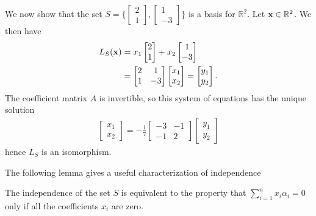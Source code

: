 \documentclass[12pt,letterpaper,reqno]{article}
\numberwithin{equation}{section}
\begin{document}
\begin{example}
We now show that the set $S=\{\begin{bmatrix}
	2 \\ 1
\end{bmatrix}, \begin{bmatrix}
	1 \\ -3
\end{bmatrix} \}$ is a basis for $\mathbb{R}^2$. Let ${\bf x} \in \mathbb{R}^2$. We then have 
\begin{align*}
	L_S({\bf x})&=x_1\begin{bmatrix}
	2 \\ 1
\end{bmatrix}+x_2\begin{bmatrix}
	1 \\ -3
\end{bmatrix} \\
&=\begin{bmatrix}
	2 & 1 \\ 1 & -3
\end{bmatrix}\begin{bmatrix}
	x_1 \\ x_2
\end{bmatrix} =\begin{bmatrix}
	y_1 \\ y_2
\end{bmatrix}.
\end{align*} The coefficient matrix $A$ is invertible, so this system of equations has the unique solution
\begin{align*}
	\begin{bmatrix}
	x_1 \\ x_2
\end{bmatrix}=-\frac{1}{7}\begin{bmatrix}
	-3 & -1 \\ -1 & 2
\end{bmatrix}\begin{bmatrix}
	y_1 \\ y_2
\end{bmatrix}
\end{align*}
hence $L_S$ is an isomorphism.	
\end{example}

The following lemma gives a useful characterization of independence
\begin{lem}
The independence of the set $S$ is equivalent to the property that $\sum_{i=1}^nx_i\alpha_i=0$ only if all the coefficients $x_i$ are zero.	
\end{lem}
\end{document}
